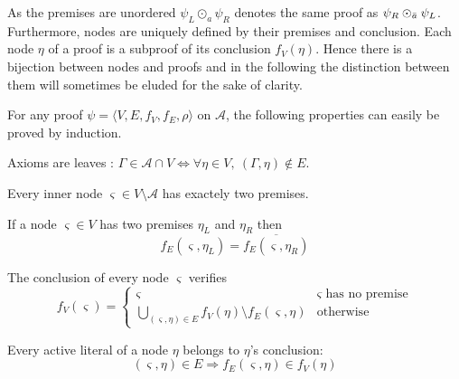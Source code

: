 \documentclass{llncs}
\begin{document}
As the premises are unordered $\psi_L \odot_a \psi_R$ denotes the same proof as $\psi_R
\odot_{\bar{a}} \psi_L$.  Furthermore, nodes are uniquely defined by their premises and conclusion.
Each node $\eta$ of a proof is a subproof of its conclusion $f_V(\eta)$.  Hence there is a bijection
between nodes and proofs and in the following the distinction between them will sometimes be eluded
for the sake of clarity.

For any proof $\psi = \langle V,E,f_V,f_E,\rho \rangle$ on $\mathcal{A}$, the following properties
can easily be proved by induction.

\begin{property}
\label{prop:proof_leaf}
Axioms are leaves : $\Gamma \in \mathcal{A} \cap V \Leftrightarrow \forall \eta \in V ,~
(\Gamma,\eta) \notin E$.
\end{property}

\begin{property}
Every inner node $\varsigma \in V \setminus \mathcal{A}$ has exactely two premises.
\end{property}

\begin{property}
\label{prop:proof_edges}
If a node $\varsigma \in V$ has two premises $\eta_L$ and $\eta_R$ then
\begin{equation*}
f_E(\varsigma,\eta_L) = \overline{f_E(\varsigma,\eta_R)}
\end{equation*}
\end{property}

\begin{property}
\label{prop:proof_conclusion}
The conclusion of every node $\varsigma$ verifies
\begin{equation*}
  f_V(\varsigma) = \begin{cases}
    \varsigma & \varsigma \text{ has no premise} \\
    \bigcup_{(\varsigma,\eta) \in E}{f_V(\eta) \setminus f_E(\varsigma,\eta)} & \text{otherwise}
  \end{cases}
\end{equation*}
\end{property}

\begin{property}
Every active literal of a node $\eta$ belongs to $\eta$'s conclusion:
\begin{equation*}
  (\varsigma,\eta) \in E \Rightarrow f_E(\varsigma,\eta) \in f_V(\eta)
\end{equation*}
\end{property}
\end{document}
